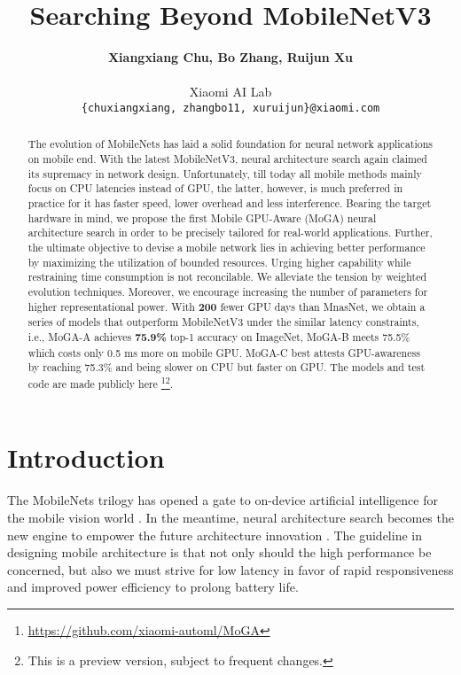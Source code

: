 \documentclass[letterpaper]{article} \usepackage{aaai20}  \usepackage{times}  \usepackage{helvet} \usepackage{courier}  \usepackage[hyphens]{url}  \usepackage{graphicx} \urlstyle{rm} \def\UrlFont{\rm}  \usepackage{graphicx}  \usepackage{amsmath}
\title{Searching Beyond MobileNetV3 }
\author{\Large \textbf{Xiangxiang Chu, Bo Zhang, Ruijun Xu}\\
\\
\Large Xiaomi AI Lab\\ 
{ \tt \{chuxiangxiang, zhangbo11, xuruijun\}@xiaomi.com}\\
}
\begin{document}
\maketitle

\begin{abstract}
The evolution of MobileNets has laid a solid foundation for neural network applications on mobile end. With the latest MobileNetV3, neural architecture search again claimed its supremacy in network design. Unfortunately, till today all mobile methods mainly focus on CPU latencies instead of GPU, the latter, however, is much preferred in practice for it has faster speed, lower overhead and less interference. Bearing the target hardware in mind, we propose the first Mobile GPU-Aware (MoGA) neural architecture search in order to be precisely tailored for real-world applications. Further, the ultimate objective to devise a mobile network lies in achieving better performance by maximizing the utilization of bounded resources. Urging higher capability while restraining time consumption is not reconcilable. We alleviate the tension by weighted evolution techniques. Moreover, we encourage increasing the number of parameters for higher representational power. With \textbf{200} fewer GPU days than MnasNet,  we obtain a series of models that outperform MobileNetV3 under the similar latency constraints, i.e., MoGA-A achieves \textbf{75.9\%} top-1 accuracy on ImageNet, MoGA-B meets 75.5\% which costs only 0.5 ms more on mobile GPU. MoGA-C best attests GPU-awareness by reaching 75.3\% and being slower on CPU but faster on GPU.  The models and test code are made publicly here \footnote{\url{https://github.com/xiaomi-automl/MoGA}}\footnote{This is a preview version, subject to frequent changes.}.
\end{abstract}

\section{Introduction}


The MobileNets trilogy has opened a gate to on-device artificial intelligence for the mobile vision world \cite{howard2017mobilenets,sandler2018mobilenetv2,howard2019searching}. In the meantime, neural architecture search becomes the new engine to empower the future architecture innovation \cite{zoph2018learning,tan2018mnasnet,cai2018proxylessnas,chu2019fairnas}. The guideline in designing mobile architecture is that not only should the high performance be concerned, but also we must strive for low latency in favor of rapid responsiveness and improved power efficiency to prolong battery life. 
\end{document}
